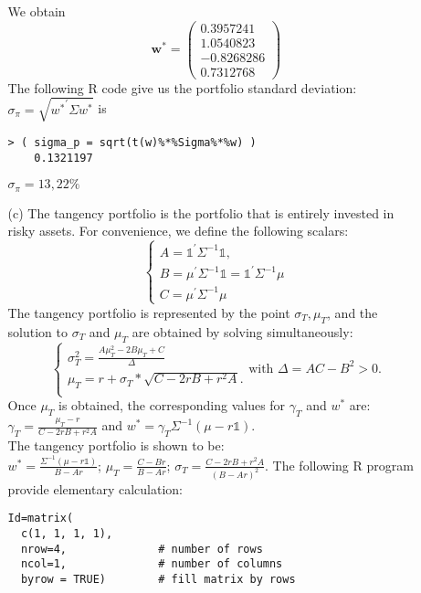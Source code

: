 \documentclass[11pt,oneside,a4paper, titlepage]{article}
\begin{document}
\begin{enumerate}
\begin{enumerate}
We obtain 
\begin{displaymath}
\mathbf{w^*} =
\left( \begin{array}{c}
0.3957241 \\
1.0540823 \\
-0.8268286 \\
0.7312768 
\end{array} \right)
\end{displaymath}
The following R code give us the portfolio standard deviation:  \(\sigma_{\pi}=\sqrt{{w^*}^{'}\Sigma w^{*}}\) is \begin{verbatim}
> ( sigma_p = sqrt(t(w)%*%Sigma%*%w) )
	0.1321197
\end{verbatim}
\(\sigma_{\pi}=13,22 \%\)
\item [(c)] The tangency portfolio is the portfolio that is entirely invested in risky assets.
For convenience, we define the following scalars:
\begin{displaymath}
\left\{\begin{array}{ll}
A=\mathds{1}^{'}\Sigma^{-1}\mathds{1},\\
B=\mu^{'}\Sigma^{-1}\mathds{1}=\mathds{1}^{'}\Sigma^{-1}\mu\\
C=\mu^{'}\Sigma^{-1}\mu
\end{array} \right.
\end{displaymath}
The tangency portfolio is represented by the point \(\sigma_T, \mu_T\), and the solution to \(\sigma_T\) and \(\mu_T\) are obtained by solving simultaneously:
\begin{displaymath}
\left\{\begin{array}{ll}
\sigma_{T}^2=\frac{A\mu_{T}^2-2B\mu_{T}+C}{\Delta}\\
\mu_{T}=r+\sigma_{T}*\sqrt{C-2rB+r^2A}.\\
\end{array} \right.
\text{with } \Delta=AC-B^2 > 0.
\end{displaymath}
Once \(\mu_T\) is obtained, the corresponding values for \(\gamma_T\) and \(w^{*}\) are:
\(\gamma_T=\frac{\mu_T-r}{C-2rB+r^2A}\) and \(w^{*}=\gamma_{T}\Sigma^{-1}(\mu-r\mathds{1})\).\\
The tangency portfolio is shown to be:\\
\(w^{*}=\frac{\Sigma^{-1}(\mu-r\mathds{1})}{B-Ar}\); \(\mu_{T}=\frac{C-Br}{B-Ar}\); \(\sigma_{T}=\frac{C-2rB+r^2A}{(B-Ar)^{2}}\).
The following R program provide elementary calculation:
\begin{verbatim}
Id=matrix(
  c(1, 1, 1, 1),
  nrow=4,              # number of rows 
  ncol=1,              # number of columns 
  byrow = TRUE)        # fill matrix by rows


\end{verbatim}
\end{enumerate}
\end{enumerate}
\end{document}

